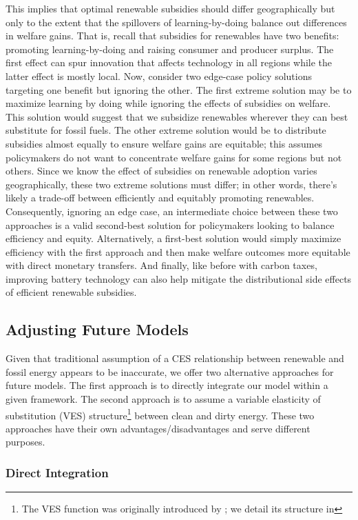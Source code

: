 \documentclass[11pt,a4paper,leqno]{extarticle}
\begin{document}
	This implies that optimal renewable subsidies should differ geographically but only to the extent that the spillovers of learning-by-doing balance out differences in welfare gains. That is, recall that subsidies for renewables have two benefits: promoting learning-by-doing and raising consumer and producer surplus. The first effect  can spur innovation that affects technology in all regions while the latter effect is mostly local. Now, consider two edge-case policy solutions targeting one benefit but ignoring the other. The first extreme solution may be to maximize learning by doing while ignoring the effects of subsidies on welfare. This solution would suggest that we subsidize renewables wherever they can best substitute for fossil fuels. The other extreme solution would be to distribute subsidies almost equally to ensure welfare gains are equitable; this assumes policymakers do not want to concentrate welfare gains for some regions but not others. Since we know the effect of subsidies on renewable adoption varies geographically, these two extreme solutions must differ; in other words, there's likely a trade-off between efficiently and equitably promoting renewables. Consequently, ignoring an edge case, an intermediate choice between these two approaches is a valid second-best solution for policymakers looking to balance efficiency and equity. Alternatively, a first-best solution would simply maximize efficiency with the first approach and then make welfare outcomes more equitable with direct monetary transfers. And finally, like before with carbon taxes, improving battery technology can also help mitigate the distributional side effects of efficient renewable subsidies. 
	
	\subsection{Adjusting Future Models}
	
	Given that traditional assumption of a CES relationship between renewable and fossil energy appears to be inaccurate, we offer two alternative approaches for future models. The first approach is to directly integrate our model within a given framework. The second approach is to assume a variable elasticity of substitution (VES) structure\footnote{ The VES function was originally introduced by \citet{VES}; we detail its structure in  } between clean and dirty energy. These two approaches have their own advantages/disadvantages and serve different purposes. 
	
	\subsubsection{Direct Integration}
	
\end{document}
